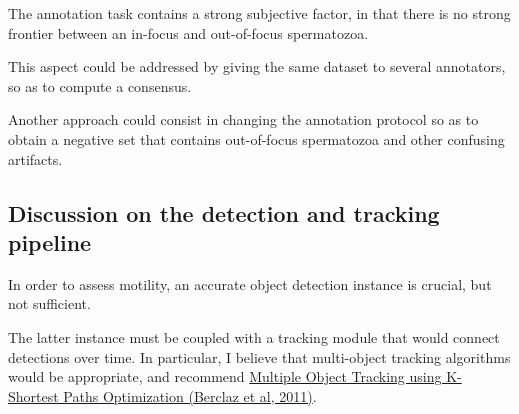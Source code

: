 \documentclass[11pt]{article}
\begin{document}
The annotation task contains a strong subjective factor, in that there is no strong frontier between an
in-focus and out-of-focus spermatozoa.

This aspect could be addressed by giving the same dataset to several annotators, so as to
compute a consensus.

Another approach could consist in changing the annotation protocol so as to obtain a negative set that contains out-of-focus spermatozoa and other confusing
artifacts.

\subsection{Discussion on the detection and tracking pipeline}
\label{sec:org74d4c7f}

In order to assess motility, an accurate object detection instance is crucial, but not sufficient.

The latter instance must be coupled with a tracking module that would connect detections over time.
In particular, I believe that multi-object tracking algorithms would be appropriate,
and recommend \href{https://infoscience.epfl.ch/record/164041?ln=en}{Multiple Object Tracking using K-Shortest Paths Optimization (Berclaz et al, 2011)}.
\end{document}
